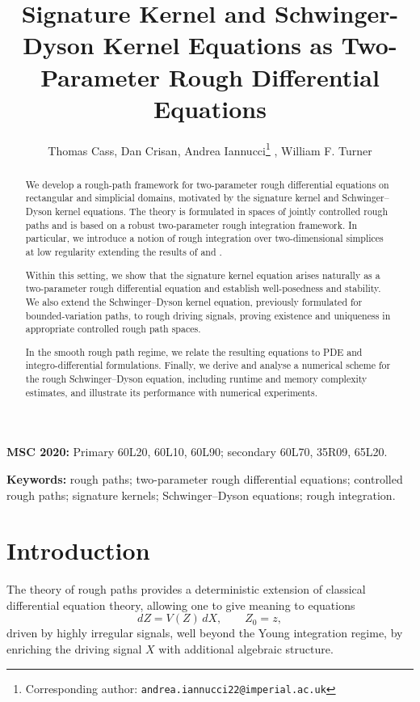\documentclass{article}%
\title{Signature Kernel and Schwinger-Dyson Kernel Equations as Two-Parameter Rough Differential Equations}
\author{Thomas Cass, Dan Crisan, Andrea Iannucci\thanks{Corresponding author: \texttt{andrea.iannucci22@imperial.ac.uk}}  , William F. Turner}
\affil{Department of Mathematics, Imperial College London}
\begin{document}
\maketitle
\begin{abstract}
We develop a rough-path framework for two-parameter rough differential equations on rectangular and simplicial domains, motivated by the signature kernel and Schwinger--Dyson kernel equations. The theory is formulated in spaces of jointly controlled rough paths and is based on a robust two-parameter rough integration framework. In particular, we introduce a notion of rough integration over two-dimensional simplices at low regularity extending the results of \cite{cass2023fubini} and \cite{gerasimovivcs2019hormander}.

Within this setting, we show that the signature kernel equation arises naturally as a two-parameter rough differential equation and establish well-posedness and stability. We also extend the Schwinger--Dyson kernel equation, previously formulated for bounded-variation paths, to rough driving signals, proving existence and uniqueness in appropriate controlled rough path spaces.

In the smooth rough path regime, we relate the resulting equations to PDE and integro-differential formulations. Finally, we derive and analyse a numerical scheme for the rough Schwinger--Dyson equation, including runtime and memory complexity estimates, and illustrate its performance with numerical experiments.
\end{abstract}


\noindent\textbf{MSC 2020:}
Primary 60L20, 60L10, 60L90; secondary 60L70, 35R09, 65L20.

\medskip

\noindent\textbf{Keywords:}
rough paths; two-parameter rough differential equations; controlled rough paths;
signature kernels; Schwinger--Dyson equations; rough integration.

\section{Introduction}

The theory of rough paths provides a deterministic extension of classical differential equation theory, allowing one to give meaning to equations
\[
dZ = V(Z)\, dX, \qquad Z_0 = z,
\]
driven by highly irregular signals, well beyond the Young integration regime, by enriching the driving signal $X$ with additional algebraic structure.
\end{document}
